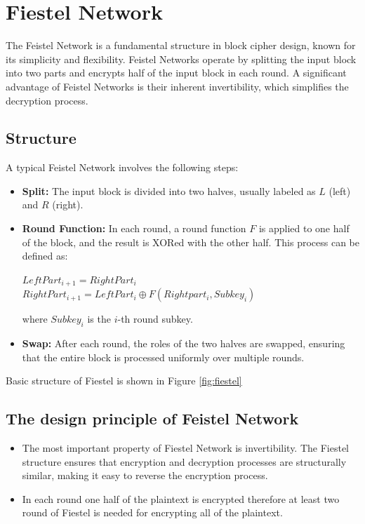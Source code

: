 \section{Fiestel Network}
The Feistel Network is a fundamental structure in block cipher design, known for its simplicity and flexibility. Feistel Networks operate by splitting the input block into two parts and encrypts half of the input block in each round.  A significant advantage of Feistel Networks is their inherent invertibility, which simplifies the decryption process.

\subsection{Structure}
A typical Feistel Network involves the following steps:

    \begin{itemize}
        \item \textbf{Split:} The input block is divided into two halves, usually labeled as $L$ (left) and $R$ (right).
        \item \textbf{Round Function:} In each round, a round function $F$ is applied to one half of the block, and the result is XORed with the other half. This process can be defined as:
        \begin{center}
            $LeftPart_{i+1} = RightPart_i$ \\
            $RightPart_{i+1} = LeftPart_i \oplus F(Rightpart_i, Subkey_i)$
        \end{center}
        where $Subkey_i$ is the  $i$-th round subkey.
        \item \textbf{Swap:} After each round, the roles of the two halves are swapped, ensuring that the entire block is processed uniformly over multiple rounds.
    \end{itemize}
Basic structure of Fiestel is shown in Figure \ref{fig:fiestel}    
\subsection{The design principle of Feistel Network}
\begin{itemize}
    \item The most important property of Fiestel Network is invertibility. The Fiestel structure ensures that encryption and decryption processes are structurally similar, making it easy to reverse the encryption process. 
    \item In each round one half of the plaintext is encrypted therefore at least two round of Fiestel is needed for encrypting all of the plaintext.
\end{itemize}


